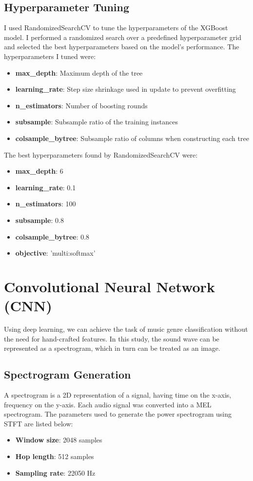\documentclass[11.5pt]{article}
\begin{document}
\subsection{Hyperparameter Tuning}
I used RandomizedSearchCV to tune the hyperparameters of the XGBoost model. I performed a randomized search over a predefined hyperparameter grid and selected the best hyperparameters based on the model's performance. The hyperparameters I tuned were:
\begin{itemize}
    \item \textbf{max\_depth}: Maximum depth of the tree
    \item \textbf{learning\_rate}: Step size shrinkage used in update to prevent overfitting
    \item \textbf{n\_estimators}: Number of boosting rounds
    \item \textbf{subsample}: Subsample ratio of the training instances
    \item \textbf{colsample\_bytree}: Subsample ratio of columns when constructing each tree
\end{itemize}
The best hyperparameters found by RandomizedSearchCV were:
\begin{itemize}
    \item \textbf{max\_depth}: 6
    \item \textbf{learning\_rate}: 0.1
    \item \textbf{n\_estimators}: 100
    \item \textbf{subsample}: 0.8
    \item \textbf{colsample\_bytree}: 0.8
    \item \textbf{objective}: 'multi:softmax'
\end{itemize}

\pagebreak
\section{Convolutional Neural Network (CNN)} \label{sec:cnn}
Using deep learning, we can achieve the task of music genre classification without the need for hand-crafted features. In this study, the sound wave can be represented as a spectrogram, which in turn can be treated as an image.

\subsection{Spectrogram Generation}
A spectrogram is a 2D representation of a signal, having time on the x-axis, frequency on the y-axis. Each audio signal was converted into a MEL spectrogram. The parameters used to generate the power spectrogram using STFT are listed below:
\begin{itemize}
    \item \textbf{Window size}: 2048 samples
    \item \textbf{Hop length}: 512 samples
    \item \textbf{Sampling rate}: 22050 Hz
\end{itemize}
\end{document}
